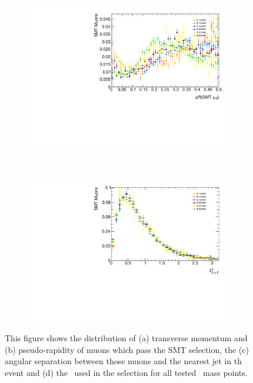 \begin{figure}[t]
\begin{subfigure}{0.49\linewidth}
\includegraphics[width=\textwidth]{PartBoosted/Plots/h_smt_jet_dr.pdf}
\end{subfigure}
~
\begin{subfigure}{0.49\linewidth}
\includegraphics[width=\textwidth]{PartBoosted/Plots/h_smt_chi2.pdf}
\end{subfigure}

\caption{This figure shows the distribution of (a) transverse momentum and (b) pseudo-rapidity of muons which pass the SMT selection, the (c) angular separation between those muons and the nearest jet in th event and (d) the \xsm\ used in the selection for all tested \Zprime\ mass points.} \label{fig:BoostedControlMI10}
\end{figure}
